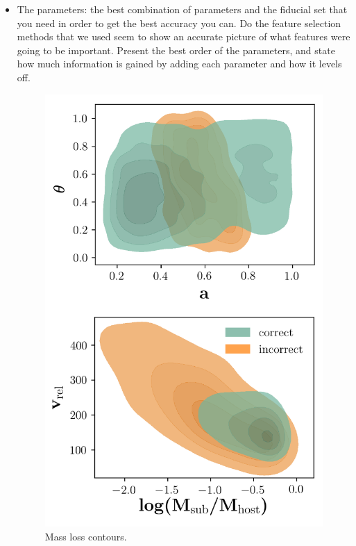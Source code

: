 \documentclass[fleqn,usenatbib]{mnras}
\begin{document}
\begin{itemize}
    \item The parameters: the best combination of parameters and the fiducial set that you need in order to get the best accuracy you can. Do the feature selection methods that we used seem to show an accurate picture of what features were going to be important. Present the best order of the parameters, and state how much information is gained by adding each parameter and how it levels off. 
\begin{figure}
	\includegraphics[width=\textwidth]{Figures/survival_contours}
    \caption{Mass loss contours.}
    \label{fig:survival_contours}
\end{figure}
\end{itemize}
\end{document}
